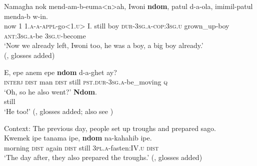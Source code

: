 \begin{exe}
	\ex\label{exAppendixCoastalMarindAlso1}
	\gll Namagha nok mend-am-b-euma<n>ah, Iwoni \textbf{ndom}, patul d-a-ola, imimil-patul menda-b w-in.\\
	now 1 1.\textsc{a}-\textsc{a}-\textsc{appl}-go<1.\textsc{u}> I. still boy \textsc{dur}-3\textsc{sg}.\textsc{a}-\textsc{cop}:3\textsc{sg}.\textsc{u} grown\_up-boy \textsc{ant}:3\textsc{sg}.\textsc{a}-be 3\textsc{sg}.\textsc{u}-become\\
	\glt \lq Now we already left, Iwoni too, he was a boy, a big boy already.'
	\\(\cite{Olsson2015}, glosses added)

\ex\label{exAppendixCoastalMarindAlso2}
	\begin{xlist}
		 \gll E, epe anem epe \textbf{ndom} d-a-ghet ay?\\
		\textsc{interj} \textsc{dist} man \textsc{dist} still \textsc{pst}.\textsc{dur}-3\textsc{sg}.\textsc{a}-be\_moving \textsc{q}\\
		\glt \lq Oh, so he also went?'
		 \gll \textbf{Ndom}.\\
		still\\
		\glt \lq He too!' (\cite{Olsson2015}, glosses added; also see \cite[115]{Olsson2017})
	\end{xlist}
	
	\ex\label{exAppendixCoastalMarindAlso3}
	Context: The previous day, people set up troughs and prepared sago.\\
	\gll Kwemek ipe tanama ipe, \textbf{ndom} na-kahahib ipe.\\
	morning \textsc{dist} again \textsc{dist} still 3\textsc{pl}.\textsc{a}-fasten:IV.\textsc{u} \textsc{dist}\\
	\glt \lq The day after, they also prepared the troughs.\rq{ }(\cite{Olsson2015}, glosses added)
\end{exe}

